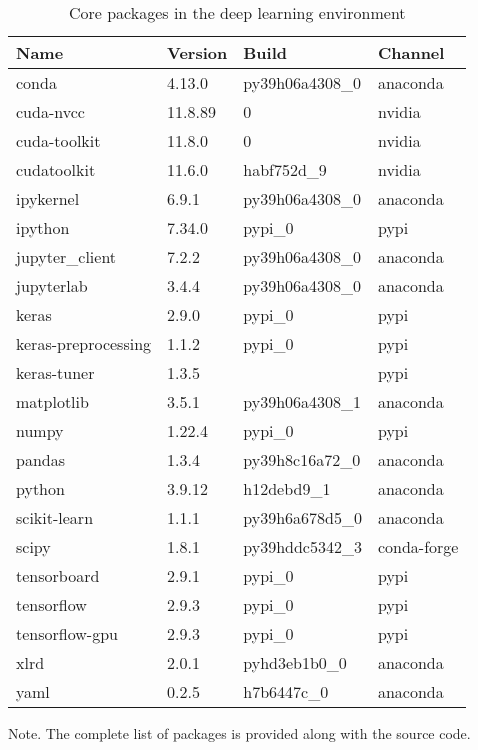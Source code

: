 \begin{table}[h]
  \centering
  \begin{tabular}{llll}
    \hline
    Name                & Version & Build          & Channel     \\
    \hline
    conda               & 4.13.0  & py39h06a4308_0 & anaconda    \\
    cuda-nvcc           & 11.8.89 & 0              & nvidia      \\
    cuda-toolkit        & 11.8.0  & 0              & nvidia      \\
    cudatoolkit         & 11.6.0  & habf752d_9     & nvidia      \\
    ipykernel           & 6.9.1   & py39h06a4308_0 & anaconda    \\
    ipython             & 7.34.0  & pypi_0         & pypi        \\
    jupyter\_client     & 7.2.2   & py39h06a4308_0 & anaconda    \\
    jupyterlab          & 3.4.4   & py39h06a4308_0 & anaconda    \\
    keras               & 2.9.0   & pypi_0         & pypi        \\
    keras-preprocessing & 1.1.2   & pypi_0         & pypi        \\
    keras-tuner         & 1.3.5   &                & pypi        \\
    matplotlib          & 3.5.1   & py39h06a4308_1 & anaconda    \\
    numpy               & 1.22.4  & pypi_0         & pypi        \\
    pandas              & 1.3.4   & py39h8c16a72_0 & anaconda    \\
    python              & 3.9.12  & h12debd9_1     & anaconda    \\
    scikit-learn        & 1.1.1   & py39h6a678d5_0 & anaconda    \\
    scipy               & 1.8.1   & py39hddc5342_3 & conda-forge \\
    tensorboard         & 2.9.1   & pypi_0         & pypi        \\
    tensorflow          & 2.9.3   & pypi_0         & pypi        \\
    tensorflow-gpu      & 2.9.3   & pypi_0         & pypi        \\
    xlrd                & 2.0.1   & pyhd3eb1b0_0   & anaconda    \\
    yaml                & 0.2.5   & h7b6447c_0     & anaconda    \\
    \hline
  \end{tabular}
  \caption{Core packages in the deep learning environment}
  \label{si_table19}
\end{table}
Note. The complete list of packages is provided along with the source code.



